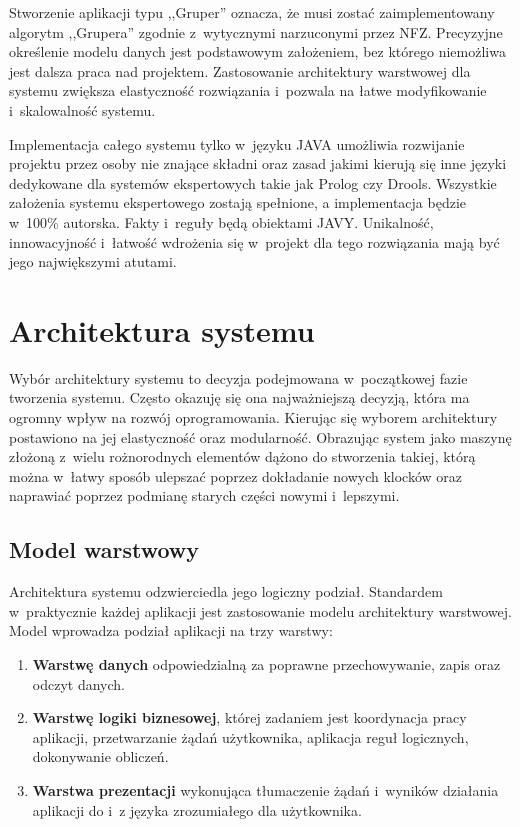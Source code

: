 Stworzenie aplikacji typu ,,Gruper'' oznacza, że musi zostać zaimplementowany algorytm ,,Grupera'' zgodnie z~wytycznymi narzuconymi przez NFZ. Precyzyjne określenie modelu danych jest podstawowym założeniem, bez którego niemożliwa jest dalsza praca nad projektem. Zastosowanie architektury warstwowej dla systemu zwiększa elastyczność rozwiązania i~pozwala na łatwe modyfikowanie i~skalowalność systemu.

Implementacja całego systemu tylko w~języku JAVA umożliwia rozwijanie projektu przez osoby nie znające składni oraz zasad jakimi kierują się inne języki dedykowane dla systemów ekspertowych takie jak Prolog czy Drools. Wszystkie założenia systemu ekspertowego zostają spełnione, a implementacja będzie w~100\% autorska. Fakty i~reguły będą obiektami JAVY. Unikalność, innowacyjność i~łatwość wdrożenia się w~projekt dla tego rozwiązania mają być jego największymi atutami.



\section{Architektura systemu}
\label{sec:architekturaSystemu}

Wybór architektury systemu to decyzja podejmowana w~początkowej fazie tworzenia systemu. Często okazuję się ona najważniejszą decyzją, która ma ogromny wpływ na rozwój oprogramowania\cite{sienkiewicz_architektura}. Kierując się wyborem architektury postawiono na jej elastyczność oraz modularność. Obrazując system jako maszynę złożoną z~wielu rożnorodnych elementów dążono do stworzenia takiej, którą można w~łatwy sposób ulepszać poprzez dokładanie nowych klocków oraz naprawiać poprzez podmianę starych części nowymi i~lepszymi.

\subsection{Model warstwowy}
\label{sec:model3warstwowy}
Architektura systemu odzwierciedla jego logiczny podział. Standardem w~praktycznie każdej aplikacji jest zastosowanie modelu architektury warstwowej\cite{sienkiewicz_architektura}. Model wprowadza podział aplikacji na trzy warstwy:
\begin{enumerate}
 \item \textbf{Warstwę danych} odpowiedzialną za poprawne przechowywanie, zapis oraz odczyt danych.
 \item \textbf{Warstwę logiki biznesowej}, której zadaniem jest koordynacja pracy aplikacji, przetwarzanie żądań użytkownika, aplikacja reguł logicznych, dokonywanie obliczeń.
 \item \textbf{Warstwa prezentacji} wykonująca tłumaczenie żądań i~wyników działania aplikacji do i~z języka zrozumiałego dla użytkownika.
\end{enumerate}

